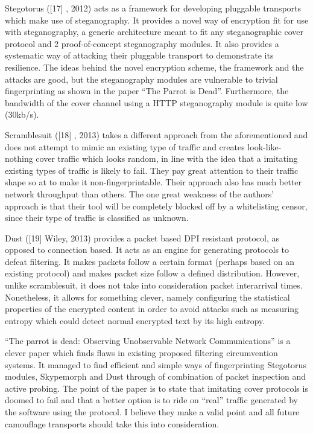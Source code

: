 \documentclass[11pt]{book} %
\begin{document}
Stegotorus ([17] , 2012) acts as a framework for developing pluggable transports which make use of steganography. It provides a novel way of encryption fit for use with steganography, a generic architecture meant to fit any steganographic cover protocol and 2 proof-of-concept steganography modules. It also provides a systematic way of attacking their pluggable transport to demonstrate its resilience. The ideas behind the novel encryption scheme, the framework and the attacks are good, but the steganography modules are vulnerable to trivial fingerprinting as shown in the paper “The Parrot is Dead”. Furthermore, the bandwidth of the cover channel using a HTTP steganography module is quite low (30kb/s).

Scramblesuit ([18] , 2013) takes a different approach from the aforementioned and does not attempt to mimic an existing type of traffic and creates look-like-nothing cover traffic which looks random, in line with the idea that a imitating existing types of traffic is likely to fail. They pay great attention to their traffic shape so at to make it non-fingerprintable. Their approach also has much better network throughput than others. The one great weakness of the authors’ approach is that their tool will be completely blocked off by a whitelisting censor, since their type of  traffic is classified as unknown.

Dust ([19] Wiley, 2013) provides a packet based DPI resistant protocol, as opposed to connection based. It acts as an engine for generating protocols to defeat filtering. It makes packets follow a certain format (perhaps based on an existing protocol) and makes packet size follow a defined distribution. However, unlike scramblesuit, it does not take into consideration packet interarrival times. Nonetheless, it allows for something clever, namely configuring the statistical properties of the encrypted content in order to avoid attacks such as measuring entropy which could detect normal encrypted text by its high entropy.

“The parrot is dead: Observing Unobservable Network Communications” is a clever paper which finds flaws in existing proposed filtering circumvention systems. It managed to find efficient and simple ways of fingerprinting Stegotorus modules, Skypemorph and Dust through of combination of packet inspection and active probing. The point of the paper is to state that imitating cover protocols is doomed to fail and that a better option is to ride on “real” traffic generated by the software using the protocol. I believe they make a valid point and all future camouflage transports should take this into consideration.
\end{document}
